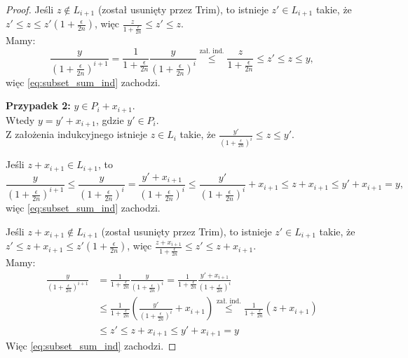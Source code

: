 \begin{proof}
	Jeśli $z \notin L_{i+1}$ (został usunięty przez Trim), to istnieje $z' \in L_{i+1}$ takie, że $z' \le z \le z'\left(1+\frac{\epsilon}{2n}\right)$, więc $\frac{z}{1+\frac{\epsilon}{2n}} \le z' \le z$. \\
	Mamy:
	\[
		\frac{y}{\left(1+\frac{\epsilon}{2n}\right)^{i+1}} = \frac{1}{1+\frac{\epsilon}{2n}} \frac{y}{\left(1+\frac{\epsilon}{2n}\right)^i} \overset{\text{zał. ind.}}{\le} \frac{z}{1+\frac{\epsilon}{2n}} \le z' \le z \le y,
	\]
	więc \eqref{eq:subset_sum_ind} zachodzi.

	\textbf{Przypadek 2:} $y \in P_i + x_{i+1}$. \\
	Wtedy $y = y' + x_{i+1}$, gdzie $y' \in P_i$. \\
	Z założenia indukcyjnego istnieje $z \in L_i$ takie, że $\frac{y'}{\left(1+\frac{\epsilon}{2n}\right)^i} \le z \le y'$.

	Jeśli $z + x_{i+1} \in L_{i+1}$, to
	\[
		\frac{y}{\left(1+\frac{\epsilon}{2n}\right)^{i+1}} \le \frac{y}{\left(1+\frac{\epsilon}{2n}\right)^i} = \frac{y' + x_{i+1}}{\left(1+\frac{\epsilon}{2n}\right)^i} \le \frac{y'}{\left(1+\frac{\epsilon}{2n}\right)^i} + x_{i+1} \le z + x_{i+1} \le y' + x_{i+1} = y,
	\]
	więc \eqref{eq:subset_sum_ind} zachodzi.

	Jeśli $z + x_{i+1} \notin L_{i+1}$ (został usunięty przez Trim), to istnieje $z' \in L_{i+1}$ takie, że $z' \le z + x_{i+1} \le z'\left(1+\frac{\epsilon}{2n}\right)$, więc $\frac{z+x_{i+1}}{1+\frac{\epsilon}{2n}} \le z' \le z + x_{i+1}$. \\
	Mamy:
	\begin{align*}
		\frac{y}{\left(1+\frac{\epsilon}{2n}\right)^{i+1}} & = \frac{1}{1+\frac{\epsilon}{2n}}\frac{y}{\left(1+\frac{\epsilon}{2n}\right)^i} = \frac{1}{1+\frac{\epsilon}{2n}} \frac{y' + x_{i+1}}{\left(1+\frac{\epsilon}{2n}\right)^i}            \\
		                                                   & \le \frac{1}{1+\frac{\epsilon}{2n}}\left(\frac{y'}{\left(1+\frac{\epsilon}{2n}\right)^i} + x_{i+1}\right) \overset{\text{zał. ind.}}{\le} \frac{1}{1+\frac{\epsilon}{2n}}(z + x_{i+1}) \\
		                                                   & \le z' \le z + x_{i+1} \le y' + x_{i+1} = y
	\end{align*}
	Więc \eqref{eq:subset_sum_ind} zachodzi.


\end{proof}

